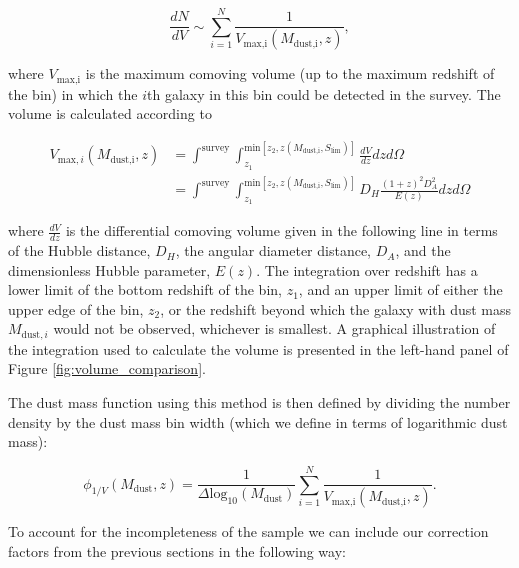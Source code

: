 \begin{equation}
    \frac{dN}{dV} \sim \sum_{i=1}^N \frac{1}{V_{\textrm{max,i}}(M_{\textrm{dust,i}},z)},
\label{eq:number_density_1/v_method}
\end{equation}

\noindent where $V_{\textrm{max,i}}$ is the maximum comoving volume (up to the maximum redshift of the bin) in which the $i$th galaxy in this bin could be detected in the survey. The volume is calculated according to

\begin{align}
    V_{\textrm{max},i}(M_{\textrm{dust,i}},z) &= \int^{\scriptscriptstyle \textrm{survey}} \int_{\scriptscriptstyle z_1}^{\scriptscriptstyle \textrm{min}[z_2, z(M_{\textrm{dust,i}},S_{\textrm{lim}})]} \frac{dV}{dz} dz d\Omega \nonumber \\
    &= \int^{\scriptscriptstyle \textrm{survey}} \int_{\scriptscriptstyle z_1}^{\scriptscriptstyle \textrm{min}[z_2, z(M_{\textrm{dust,i}},S_{\textrm{lim}})]} D_H \frac{(1+z)^2 D_A^2}{E(z)} dz d\Omega
\label{eq:volume_1/v_method}
\end{align}

\noindent where $\frac{dV}{dz}$ is the differential comoving volume given in the following line in terms of the Hubble distance, $D_H$, the angular diameter distance, $D_A$, and the dimensionless Hubble parameter, $E(z)$. The integration over redshift has a lower limit of the bottom redshift of the bin, $z_1$, and an upper limit of either the upper edge of the bin, $z_2$, or the redshift beyond which the galaxy with dust mass $M_{\textrm{dust},i}$ would not be observed, whichever is smallest. A graphical illustration of the integration used to calculate the volume is presented in the left-hand panel of Figure \ref{fig:volume_comparison}.

The dust mass function using this method is then defined by dividing the number density by the dust mass bin width (which we define in terms of logarithmic dust mass):

\begin{equation}
    \phi_{1/V}(M_{\textrm{dust}},z) = \frac{1}{\Delta \textrm{log}_{10}(M_{\textrm{dust}})} \sum_{i=1}^N \frac{1}{V_{\textrm{max,i}}(M_{\textrm{dust,i}},z)}.
\label{eq:phi_1/v_method}
\end{equation}

To account for the incompleteness of the sample we can include our correction factors from the previous sections in the following way:

